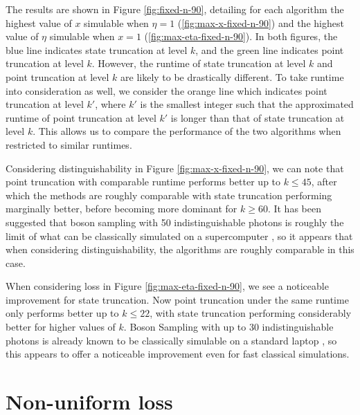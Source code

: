 The results are shown in Figure \ref{fig:fixed-n-90}, detailing for each algorithm the highest value of $x$ simulable when $\eta=1$ (\ref{fig:max-x-fixed-n-90}) and the highest value of $\eta$ simulable when $x=1$ (\ref{fig:max-eta-fixed-n-90}). 
In both figures, the blue line indicates state truncation at level $k$, and the green line indicates point truncation at level $k$. 
However, the runtime of state truncation at level $k$ and point truncation at level $k$ are likely to be drastically different. 
To take runtime into consideration as well, we consider the orange line which indicates point truncation at level $k'$, where $k'$ is the smallest integer such that the approximated runtime of point truncation at level $k'$ is longer than that of state truncation at level $k$. 
This allows us to compare the performance of the two algorithms when restricted to similar runtimes.

Considering distinguishability in Figure \ref{fig:max-x-fixed-n-90}, we can note that point truncation with comparable runtime performs better up to $k\leq 45$, after which the methods are roughly comparable with state truncation performing marginally better, before becoming more dominant for $k\geq 60$. 
It has been suggested that boson sampling with 50 indistinguishable photons is roughly the limit of what can be classically simulated on a supercomputer \cite{neville2017, clifford2017, zhang2018}, so it appears that when considering distinguishability, the algorithms are roughly comparable in this case.

When considering loss in Figure \ref{fig:max-eta-fixed-n-90}, we see a noticeable improvement for state truncation. 
Now point truncation under the same runtime only performs better up to $k\leq 22$, with state truncation performing considerably better for higher values of $k$. 
Boson Sampling with up to 30 indistinguishable photons is already known to be classically simulable on a standard laptop \cite{neville2017}, so this appears to offer a noticeable improvement even for fast classical simulations.



\section{Non-uniform loss}
\label{sec:non-uniform-loss}

